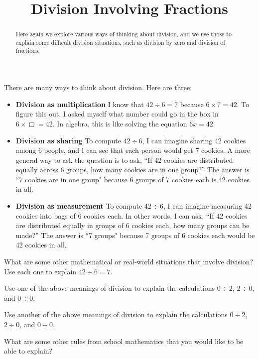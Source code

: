 \documentclass{ximera}
\title{Division Involving Fractions}
\begin{document}
\begin{abstract}
Here again we explore various ways of thinking about division, and we use those to explain some difficult division situations, such as division by zero and division of fractions.
\end{abstract}
\maketitle


There are many ways to think about division.  Here are three:
\begin{itemize}
\item \textbf{Division as multiplication}  I know that $42\div 6=7$ because $6\times 7=42$.  To figure this out, I asked myself what number could go in the box in $6\times \Box =42$.  In algebra, this is like solving the equation $6x=42$.

\item \textbf{Division as sharing}  To compute $42\div 6$, I can imagine sharing 42 cookies among 6 people, and I can see that each person would get 7 cookies. A more general way to ask the question is to ask, ``If 42 cookies are distributed equally across 6 groups, how many cookies are in one group?''  The answer is ``7 cookies are in one group" because 6 groups of 7 cookies each is 42 cookies in all.  

\item \textbf{Division as measurement}  To compute  $42\div 6$, I can imagine measuring 42 cookies into bags of 6 cookies each.  In other words, I can ask, ``If 42 cookies are distributed equally in groups of 6 cookies each, how many groups can be made?''  The answer is ``7 groups"  because 7 groups of 6 cookies each would be 42 cookies in all.   
\end{itemize}

\begin{problem}
What are some other mathematical or real-world situations that involve division?  Use each one to explain $42\div 6=7$.  
\begin{freeResponse}
\end{freeResponse}
\end{problem}

\begin{problem}
Use one of the above meanings of division to explain the calculations $0\div 2$, $2\div 0$, and $0\div 0$.  
\begin{freeResponse}
\end{freeResponse}
\end{problem}

\begin{problem}
Use another of the above meanings of division to explain the calculations $0\div 2$, $2\div 0$, and $0\div 0$.  
\begin{freeResponse}
\end{freeResponse}
\end{problem}

\begin{problem}
What are some other rules from school mathematics that you would like to be able to explain?  
\begin{freeResponse}
\end{freeResponse}
\end{problem}
\end{document}
